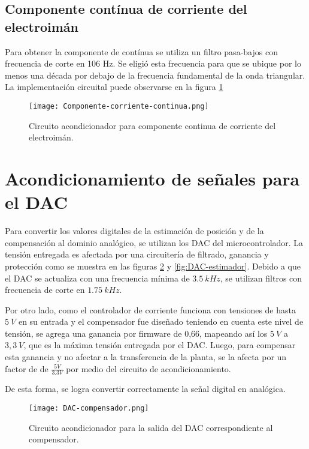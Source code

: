 \subsection{Componente  contínua de corriente del electroimán}

\noindent Para obtener la componente de contínua se utiliza un filtro pasa-bajos con frecuencia de corte en 106 Hz. Se eligió esta frecuencia para que se ubique por lo menos una década por debajo de la frecuencia fundamental de la onda triangular. La implementación circuital puede observarse en la figura \ref{fig:componente-corriente-continua}


\begin{figure}[H]
	\centering
	\texttt{[image: Componente-corriente-continua.png]}
	\caption{Circuito acondicionador para componente continua de corriente del electroimán.
	}
	\label{fig:componente-corriente-continua}
\end{figure}

\section{Acondicionamiento de señales para el DAC}

\noindent Para convertir los valores digitales de la estimación de posición y de la compensación al dominio analógico, se utilizan los DAC del microcontrolador. La tensión entregada es afectada por una circuitería de filtrado, ganancia y protección como se muestra en las figuras \ref{fig:DAC-compensador} y \ref{fig:DAC-estimador}. Debido a que el DAC se actualiza con una frecuencia mínima de $3.5\:kHz$, se utilizan filtros con frecuencia de corte en $1.75\:kHz$.

\noindent Por otro lado, como el controlador de corriente funciona con tensiones de hasta $5\:V$ en su entrada y el compensador fue diseñado teniendo en cuenta este nivel de tensión, se agrega una ganancia por firmware de 0,66, mapeando así los $5\:V$ a $3,3\:V$, que es la máxima tensión entregada por el DAC. Luego, para compensar esta ganancia y no afectar a la transferencia de la planta, se la afecta por un factor de de $\frac{5V}{3.3V}$ por medio del circuito de acondicionamiento.

\noindent De esta forma, se logra convertir correctamente la señal digital en analógica.


\begin{figure}[H]
	\centering
	\texttt{[image: DAC-compensador.png]}
	\caption{Circuito acondicionador para la salida del DAC correspondiente al compensador.}
	\label{fig:DAC-compensador}
\end{figure}

